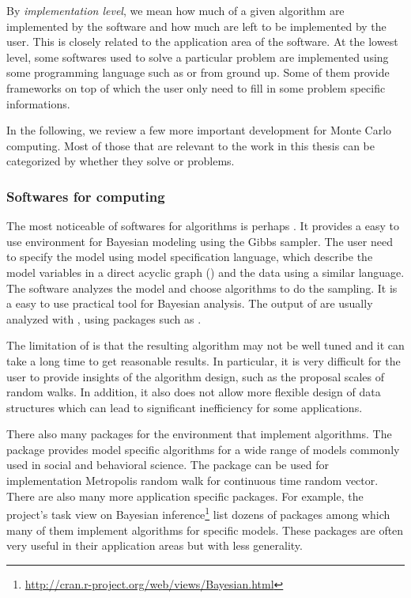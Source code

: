  By
\emph{implementation level}, we mean how much of a given algorithm are
implemented by the software and how much are left to be implemented by the
user. This is closely related to the application area of the software. At the
lowest level, some softwares used to solve a particular problem are
implemented using some programming language such as \rlang or \cpp from ground
up. Some of them provide frameworks on top of which the user only need to fill
in some problem specific informations.

In the following, we review a few more important development for Monte Carlo
computing. Most of those that are relevant to the work in this thesis can be
categorized by whether they solve \mcmc or \smc problems.

\subsubsection{Softwares for \protect\mcmc computing}
\label{ssub:Softwares for mcmc computing}

The most noticeable of softwares for \mcmc algorithms is perhaps \bugs
\cite{bugs, bugsbook}. It provides a easy to use environment for Bayesian
modeling using the Gibbs sampler. The user need to specify the model using
\bugs model specification language, which describe the model variables in a
direct acyclic graph (\dag) and the data using a similar language. The
software analyzes the model and choose \mcmc algorithms to do the sampling. It
is a easy to use practical tool for Bayesian analysis. The output of \bugs are
usually analyzed with \rlang, using packages such as \rcoda \cite{rcoda}.

The limitation of \bugs is that the resulting algorithm may not be well tuned
and it can take a long time to get reasonable results. In particular, it is
very difficult for the user to provide insights of the algorithm design, such
as the proposal scales of random walks. In addition, it also does not allow
more flexible design of data structures which can lead to significant
inefficiency for some applications.

There also many packages for the \rlang environment that implement \mcmc
algorithms. The \rmcmcpack \cite{rmcmcpack} package provides model specific
\mcmc algorithms for a wide range of models commonly used in social and
behavioral science. The \rmcmc \cite{rmcmc} package can be used for
implementation Metropolis random walk for continuous time random vector. There
are also many more application specific packages. For example, the \rlang
project's task view on Bayesian
inference\footnote{\url{http://cran.r-project.org/web/views/Bayesian.html}}
list dozens of packages among which many of them implement \mcmc algorithms
for specific models. These packages are often very useful in their application
areas but with less generality.

